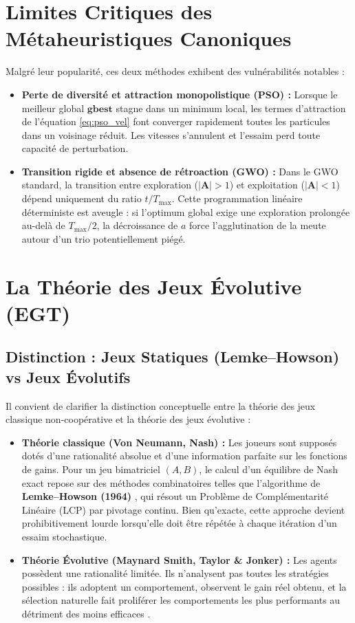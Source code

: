 \section{Limites Critiques des Métaheuristiques Canoniques}
Malgré leur popularité, ces deux méthodes exhibent des vulnérabilités notables :
\begin{itemize}[label=\textbullet]
    \item \textbf{Perte de diversité et attraction monopolistique (PSO) :} Lorsque le meilleur global $\mathbf{gbest}$ stagne dans un minimum local, les termes d'attraction de l'équation \eqref{eq:pso_vel} font converger rapidement toutes les particules dans un voisinage réduit. Les vitesses s'annulent et l'essaim perd toute capacité de perturbation.
    \item \textbf{Transition rigide et absence de rétroaction (GWO) :} Dans le GWO standard, la transition entre exploration ($|\mathbf{A}| > 1$) et exploitation ($|\mathbf{A}| < 1$) dépend uniquement du ratio $t / T_{\max}$. Cette programmation linéaire déterministe est aveugle : si l'optimum global exige une exploration prolongée au-delà de $T_{\max}/2$, la décroissance de $a$ force l'agglutination de la meute autour d'un trio potentiellement piégé.
\end{itemize}

\section{La Théorie des Jeux Évolutive (EGT)}

\subsection{Distinction : Jeux Statiques (Lemke--Howson) vs Jeux Évolutifs}
Il convient de clarifier la distinction conceptuelle entre la théorie des jeux classique non-coopérative et la théorie des jeux évolutive :
\begin{itemize}[label=\textbullet]
    \item \textbf{Théorie classique (Von Neumann, Nash) :} Les joueurs sont supposés dotés d'une rationalité absolue et d'une information parfaite sur les fonctions de gains. Pour un jeu bimatriciel $(A, B)$, le calcul d'un équilibre de Nash exact repose sur des méthodes combinatoires telles que l'algorithme de \textbf{Lemke--Howson (1964)} \cite{lemke1964equilibrium}, qui résout un Problème de Complémentarité Linéaire (LCP) par pivotage continu. Bien qu'exacte, cette approche devient prohibitivement lourde lorsqu'elle doit être répétée à chaque itération d'un essaim stochastique.
    \item \textbf{Théorie Évolutive (Maynard Smith, Taylor \& Jonker) :} Les agents possèdent une rationalité limitée. Ils n'analysent pas toutes les stratégies possibles : ils adoptent un comportement, observent le gain réel obtenu, et la sélection naturelle fait proliférer les comportements les plus performants au détriment des moins efficaces \cite{weibull1995evolutionary}.
\end{itemize}

